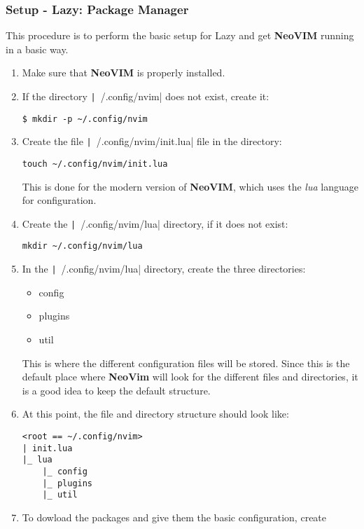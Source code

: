 \subsubsection{Setup - Lazy: Package Manager}
This procedure is to perform the basic setup for Lazy and get \textbf{NeoVIM}
running in a basic way.
\begin{enumerate}
    \item Make sure that \textbf{NeoVIM} is properly installed.
    \item If the directory \texttt|~/.config/nvim| does not exist,
    create it:
    \begin{verbatim}
$ mkdir -p ~/.config/nvim
    \end{verbatim}
    \item Create the file \texttt|~/.config/nvim/init.lua| file in the
    directory:
    \begin{verbatim}
touch ~/.config/nvim/init.lua
    \end{verbatim}
    This is done for the modern version of \textbf{NeoVIM}, which uses the
    \textit{lua} language for configuration.
    \item Create the \texttt|~/.config/nvim/lua| directory, if 
    it does not exist:
    \begin{verbatim}
mkdir ~/.config/nvim/lua
    \end{verbatim}
    \item In the \texttt|~/.config/nvim/lua| directory, create the
    three directories:
    \begin{itemize}
        \item config
        \item plugins
        \item util
    \end{itemize}
    This is where the different configuration files will be stored. Since 
    this is the default place where \textbf{NeoVim} will look for the different
    files and directories, it is a good idea to keep the default structure.
    \item At this point, the file and directory structure should look like:
    \begin{verbatim}
<root == ~/.config/nvim>
| init.lua
|_ lua
    |_ config
    |_ plugins
    |_ util
    \end{verbatim}
    \item To dowload the packages and give them the basic configuration, create

\end{enumerate}
